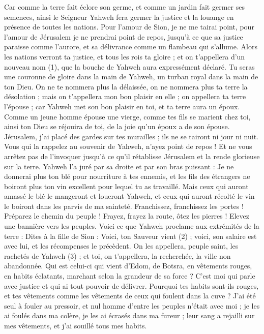 \begin{multicols}{2}
{Car comme la terre fait éclore son germe, et comme un jardin fait germer ses semences, ainsi le Seigneur Yahweh fera germer la justice et la louange en présence de toutes les nations.
\VerseOne{}Pour l'amour de Sion, je ne me tairai point, pour l'amour de Jérusalem je ne prendrai point de repos, jusqu’à ce que sa justice paraisse comme l’aurore, et sa délivrance comme un flambeau qui s’allume.
Alors les nations verront ta justice, et tous les rois ta gloire ; et on t'appellera d'un nouveau nom (1), que la bouche de Yahweh aura expressément déclaré.
Tu seras une couronne de gloire dans la main de Yahweh, un turban royal dans la main de ton Dieu.
On ne te nommera plus la délaissée, on ne nommera plus ta terre la désolation ; mais on t'appellera mon bon plaisir en elle ; on appellera ta terre l’épouse ; car Yahweh met son bon plaisir en toi, et ta terre aura un époux.
Comme un jeune homme épouse une vierge, comme tes fils se marient chez toi, ainsi ton Dieu se réjouira de toi, de la joie qu'un époux a de son épouse.
Jérusalem, j'ai placé des gardes sur tes murailles ; ils ne se tairont ni jour ni nuit. Vous qui la rappelez au souvenir de Yahweh, n’ayez point de repos !
Et ne vous arrêtez pas de l'invoquer jusqu’à ce qu'il rétablisse Jérusalem et la rende glorieuse sur la terre.
Yahweh l’a juré par sa droite et par son bras puissant : Je ne donnerai plus ton blé pour nourriture à tes ennemis, et les fils des étrangers ne boiront plus ton vin excellent pour lequel tu as travaillé.
Mais ceux qui auront amassé le blé le mangeront et loueront Yahweh, et ceux qui auront récolté le vin le boiront dans les parvis de ma sainteté.
Franchissez, franchissez les portes ! Préparez le chemin du peuple ! Frayez, frayez la route, ôtez les pierres ! Elevez une bannière vers les peuples.
Voici ce que Yahweh proclame aux extrémités de la terre : Dites à la fille de Sion : Voici, ton Sauveur vient (2) ; voici, son salaire est avec lui, et les récompenses le précèdent.
On les appellera, peuple saint, les rachetés de Yahweh (3) ; et toi, on t'appellera, la recherchée, la ville non abandonnée.
\VerseOne{}Qui est celui-ci qui vient d'Edom, de Botsra, en vêtements rouges, en habits éclatants, marchant selon la grandeur de sa force ? C'est moi qui parle avec justice et qui ai tout pouvoir de délivrer.
Pourquoi tes habits sont-ils rouges, et tes vêtements comme les vêtements de ceux qui foulent dans la cuve ?
J'ai été seul à fouler au pressoir, et nul homme d'entre les peuples n’était avec moi ; je les ai foulés dans ma colère, je les ai écrasés dans ma fureur ; leur sang a rejailli sur mes vêtements, et j'ai souillé tous mes habits.
}
\end{multicols}
